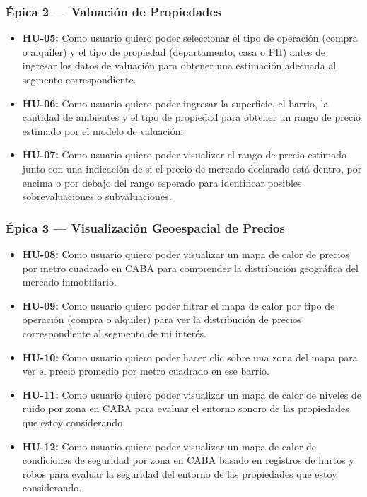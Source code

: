 \subsubsection{Épica 2 --- Valuación de Propiedades}

\begin{itemize}
\item \textbf{HU-05:} Como usuario quiero poder seleccionar el tipo de operación (compra o alquiler) y el tipo de propiedad (departamento, casa o PH) antes de ingresar los datos de valuación para obtener una estimación adecuada al segmento correspondiente.
\item \textbf{HU-06:} Como usuario quiero poder ingresar la superficie, el barrio, la cantidad de ambientes y el tipo de propiedad para obtener un rango de precio estimado por el modelo de valuación.
\item \textbf{HU-07:} Como usuario quiero poder visualizar el rango de precio estimado junto con una indicación de si el precio de mercado declarado está dentro, por encima o por debajo del rango esperado para identificar posibles sobrevaluaciones o subvaluaciones.
\end{itemize}

\subsubsection{Épica 3 --- Visualización Geoespacial de Precios}

\begin{itemize}
\item \textbf{HU-08:} Como usuario quiero poder visualizar un mapa de calor de precios por metro cuadrado en CABA para comprender la distribución geográfica del mercado inmobiliario.
\item \textbf{HU-09:} Como usuario quiero poder filtrar el mapa de calor por tipo de operación (compra o alquiler) para ver la distribución de precios correspondiente al segmento de mi interés.
\item \textbf{HU-10:} Como usuario quiero poder hacer clic sobre una zona del mapa para ver el precio promedio por metro cuadrado en ese barrio.
\item \textbf{HU-11:} Como usuario quiero poder visualizar un mapa de calor de niveles de ruido por zona en CABA para evaluar el entorno sonoro de las propiedades que estoy considerando.
\item \textbf{HU-12:} Como usuario quiero poder visualizar un mapa de calor de condiciones de seguridad por zona en CABA basado en registros de hurtos y robos para evaluar la seguridad del entorno de las propiedades que estoy considerando.
\end{itemize}


